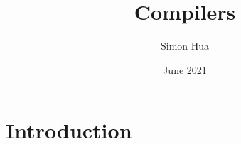 \pagestyle{appendixFancy}

\makeatletter
\renewcommand{\boxed}[1]{\text{\fboxsep=.2em\fbox{\m@th$\displaystyle#1$}}}
\makeatother

 
\newenvironment{lightgrayleftbar}{%
  \def\FrameCommand{\textcolor{lightgray}{\vrule width 3pt} \hspace{3pt}}%
  \MakeFramed {\advance\hsize-\width \FrameRestore}}%
{\endMakeFramed}

\title{Compilers}
\author{Simon Hua}
\date{June 2021}



    \maketitle
    {
        \hypersetup{linkbordercolor=white}
        \tableofcontents
    }
    \newpage
    \chapter{\textcolor{StanfordRed}{Introduction}}

